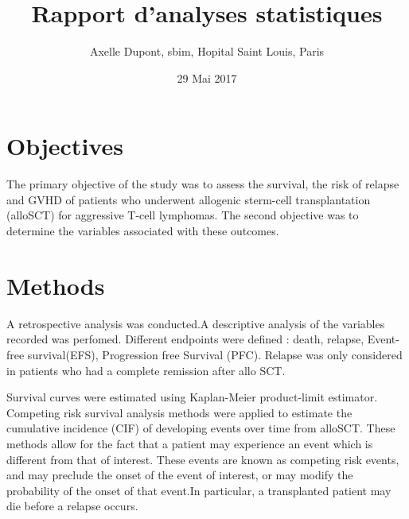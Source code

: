 \documentclass[a4paper,11pt] {article}
\begin{document}
\title{Rapport  d'analyses statistiques}
\author{Axelle Dupont, sbim, Hopital Saint Louis, Paris}
\date{29 Mai 2017}















\maketitle

\tableofcontents
\pagebreak[4]
\listoftables
\listoffigures


\pagebreak[4]

\section{Objectives}

The primary objective of the study was to assess the survival, the risk of relapse and GVHD  of patients who underwent allogenic sterm-cell transplantation (alloSCT) for aggressive T-cell lymphomas. 
The second objective was to determine the variables associated with these outcomes.

\section{Methods}

A  retrospective analysis was conducted.A descriptive analysis of the variables recorded was perfomed. Different endpoints were defined : death, relapse, Event-free survival(EFS), Progression free Survival (PFC). Relapse was only considered in patients who had a complete remission after allo SCT.

Survival curves were estimated using Kaplan-Meier product-limit estimator.
Competing risk survival analysis methods were applied to estimate the cumulative incidence (CIF) of developing events over time from alloSCT. These methods allow for the fact that a patient may experience an event which is different from that of interest. These events are known as competing risk events, and may preclude the onset of the event of interest, or may modify the probability of the onset of that event.In particular, a transplanted patient may die before a relapse occurs. 
\end{document}
